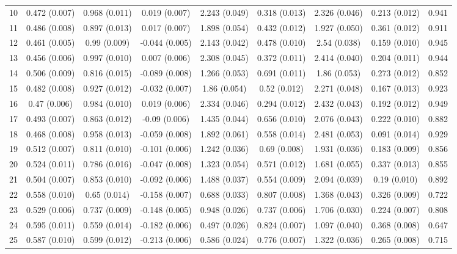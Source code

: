 \begin{tabular}{@{\extracolsep{5pt}} l cccccccc}
10 & 0.472 (0.007) & 0.968 (0.011) & 0.019 (0.007) & 2.243 (0.049) & 0.318 (0.013) & 2.326 (0.046) & 0.213 (0.012) & 0.941 \\ 
11 & 0.486 (0.008) & 0.897 (0.013) & 0.017 (0.007) & 1.898 (0.054) & 0.432 (0.012) & 1.927 (0.050) & 0.361 (0.012) & 0.911 \\ 
12 & 0.461 (0.005) & 0.99 (0.009) & -0.044 (0.005) & 2.143 (0.042) & 0.478 (0.010) & 2.54 (0.038) & 0.159 (0.010) & 0.945 \\ 
13 & 0.456 (0.006) & 0.997 (0.010) & 0.007 (0.006) & 2.308 (0.045) & 0.372 (0.011) & 2.414 (0.040) & 0.204 (0.011) & 0.944 \\ 
14 & 0.506 (0.009) & 0.816 (0.015) & -0.089 (0.008) & 1.266 (0.053) & 0.691 (0.011) & 1.86 (0.053) & 0.273 (0.012) & 0.852 \\ 
15 & 0.482 (0.008) & 0.927 (0.012) & -0.032 (0.007) & 1.86 (0.054) & 0.52 (0.012) & 2.271 (0.048) & 0.167 (0.013) & 0.923 \\ 
16 & 0.47 (0.006) & 0.984 (0.010) & 0.019 (0.006) & 2.334 (0.046) & 0.294 (0.012) & 2.432 (0.043) & 0.192 (0.012) & 0.949 \\ 
17 & 0.493 (0.007) & 0.863 (0.012) & -0.09 (0.006) & 1.435 (0.044) & 0.656 (0.010) & 2.076 (0.043) & 0.222 (0.010) & 0.882 \\ 
18 & 0.468 (0.008) & 0.958 (0.013) & -0.059 (0.008) & 1.892 (0.061) & 0.558 (0.014) & 2.481 (0.053) & 0.091 (0.014) & 0.929 \\ 
19 & 0.512 (0.007) & 0.811 (0.010) & -0.101 (0.006) & 1.242 (0.036) & 0.69 (0.008) & 1.931 (0.036) & 0.183 (0.009) & 0.856 \\ 
20 & 0.524 (0.011) & 0.786 (0.016) & -0.047 (0.008) & 1.323 (0.054) & 0.571 (0.012) & 1.681 (0.055) & 0.337 (0.013) & 0.855 \\ 
21 & 0.504 (0.007) & 0.853 (0.010) & -0.092 (0.006) & 1.488 (0.037) & 0.554 (0.009) & 2.094 (0.039) & 0.19 (0.010) & 0.892 \\ 
22 & 0.558 (0.010) & 0.65 (0.014) & -0.158 (0.007) & 0.688 (0.033) & 0.807 (0.008) & 1.368 (0.043) & 0.326 (0.009) & 0.722 \\ 
23 & 0.529 (0.006) & 0.737 (0.009) & -0.148 (0.005) & 0.948 (0.026) & 0.737 (0.006) & 1.706 (0.030) & 0.224 (0.007) & 0.808 \\ 
24 & 0.595 (0.011) & 0.559 (0.014) & -0.182 (0.006) & 0.497 (0.026) & 0.824 (0.007) & 1.097 (0.040) & 0.368 (0.008) & 0.647 \\ 
25 & 0.587 (0.010) & 0.599 (0.012) & -0.213 (0.006) & 0.586 (0.024) & 0.776 (0.007) & 1.322 (0.036) & 0.265 (0.008) & 0.715 \\ 

\end{tabular}
